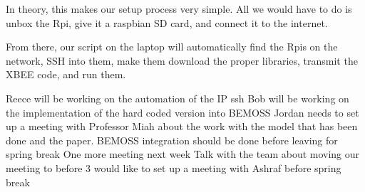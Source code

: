 \documentclass[fontsize=11pt, %
                             paper=letter, %
                             twoside, %
                             captions=tableheading,
                             index=totoc,
                             hyperref]{labbook}
\begin{document}
In theory, this makes our setup process very simple. All we would have to do is unbox the Rpi, give it a raspbian SD card, and connect it to the internet. 

From there, our script on the laptop will automatically find the Rpis on the network, SSH into them, make them download the proper libraries, transmit the XBEE code, and run them. 
    

Reece will be working on the automation of the IP ssh
Bob will be working on the implementation of the hard coded version into BEMOSS
Jordan needs to set up a meeting with Professor Miah about the work with the model that has been done and the paper.
BEMOSS integration should be done before leaving for spring break
One more meeting next week
Talk with the team about moving our meeting to before 3
would like to set up a meeting with Ashraf before spring break
\end{document}
